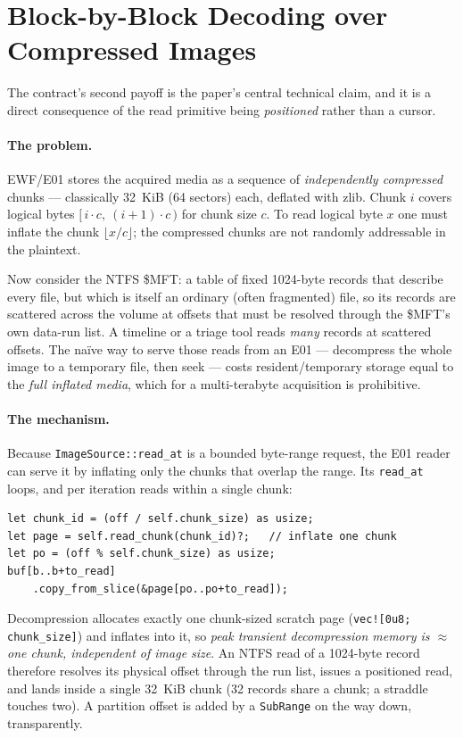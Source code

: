 \documentclass[10pt,twocolumn]{article}
\begin{document}
\section{Block-by-Block Decoding over Compressed Images}\label{sec:blockbyblock}

The contract's second payoff is the paper's central technical claim, and it is a
direct consequence of the read primitive being \emph{positioned} rather than a
cursor.

\paragraph{The problem.}
EWF/E01 stores the acquired media as a sequence of \emph{independently
compressed} chunks --- classically 32~KiB (64 sectors) each, deflated with zlib.
Chunk $i$ covers logical bytes $[\,i\cdot c,\ (i{+}1)\cdot c\,)$ for chunk size
$c$. To read logical byte $x$ one must inflate the chunk $\lfloor x/c\rfloor$; the
compressed chunks are not randomly addressable in the plaintext.

Now consider the NTFS \$MFT: a table of fixed 1024-byte records that describe
every file, but which is itself an ordinary (often fragmented) file, so its
records are scattered across the volume at offsets that must be resolved through
the \$MFT's own data-run list. A timeline or a triage tool reads \emph{many}
records at scattered offsets. The na\"ive way to serve those reads from an E01 ---
decompress the whole image to a temporary file, then seek --- costs
resident/temporary storage equal to the \emph{full inflated media}, which for a
multi-terabyte acquisition is prohibitive.

\paragraph{The mechanism.}
Because \texttt{ImageSource::read\_at} is a bounded byte-range request, the E01
reader can serve it by inflating only the chunks that overlap the range. Its
\texttt{read\_at} loops, and per iteration reads within a single chunk:
\begin{lstlisting}
let chunk_id = (off / self.chunk_size) as usize;
let page = self.read_chunk(chunk_id)?;   // inflate one chunk
let po = (off % self.chunk_size) as usize;
buf[b..b+to_read]
    .copy_from_slice(&page[po..po+to_read]);
\end{lstlisting}
Decompression allocates exactly one chunk-sized scratch page
(\lstinline|vec![0u8; chunk_size]|) and inflates into it, so \emph{peak transient
decompression memory is $\approx$ one chunk, independent of image size}. An NTFS
read of a 1024-byte record therefore resolves its physical offset through the run
list, issues a positioned read, and lands inside a single 32~KiB chunk (32
records share a chunk; a straddle touches two). A partition offset is added by a
\texttt{SubRange} on the way down, transparently.
\end{document}
